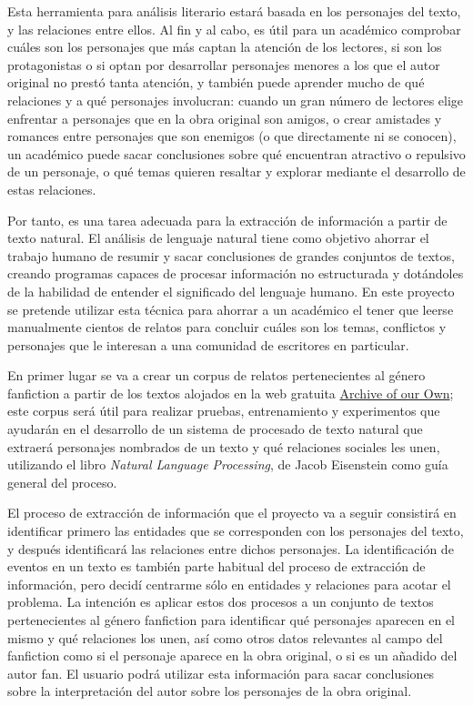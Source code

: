 \documentclass{pre-tfg}
\begin{document}
Esta herramienta para análisis literario estará basada en los personajes del texto, y las relaciones entre ellos. Al fin y al cabo, es útil para un académico comprobar cuáles son los personajes que más captan la atención de los lectores, si son los protagonistas o si optan por desarrollar personajes menores a los que el autor original no prestó tanta atención, y también puede aprender mucho de qué relaciones y a qué personajes involucran: cuando un gran número de lectores elige enfrentar a personajes que en la obra original son amigos, o crear amistades y romances entre personajes que son enemigos (o que directamente ni se conocen), un académico puede sacar conclusiones sobre qué encuentran atractivo o repulsivo de un personaje, o qué temas quieren resaltar y explorar mediante el desarrollo de estas relaciones.

Por tanto, es una tarea adecuada para la extracción de información a partir de texto natural. El análisis de lenguaje natural tiene como objetivo ahorrar el trabajo humano de resumir y sacar conclusiones de grandes conjuntos de textos, creando programas capaces de procesar información no estructurada y dotándoles de la habilidad de entender el significado del lenguaje humano. En este proyecto se pretende utilizar esta técnica para ahorrar a un académico el tener que leerse manualmente cientos de relatos para concluir cuáles son los temas, conflictos y personajes que le interesan a una comunidad de escritores en particular.

En primer lugar se va a crear un corpus de relatos pertenecientes al género fanfiction a partir de los textos alojados en la web gratuita \href{https://www.archiveofourown.org/}{Archive of our Own}; este corpus será útil para realizar pruebas, entrenamiento y experimentos que ayudarán en el desarrollo de un sistema de procesado de texto natural que extraerá personajes nombrados de un texto y qué relaciones sociales les unen, utilizando el libro \textit{Natural Language Processing}, de Jacob Eisenstein \cite{jacob} como guía general del proceso.

El proceso de extracción de información que el proyecto va a seguir consistirá en identificar primero las entidades que se corresponden con los personajes del texto, y después identificará las relaciones entre dichos personajes. La identificación de eventos en un texto es también parte habitual del proceso de extracción de información, pero decidí centrarme sólo en entidades y relaciones para acotar el problema. La intención es aplicar estos dos procesos a un conjunto de textos pertenecientes al género fanfiction para identificar qué personajes aparecen en el mismo y qué relaciones los unen, así como otros datos relevantes al campo del fanfiction como si el personaje aparece en la obra original, o si es un añadido del autor fan. El usuario podrá utilizar esta información para sacar conclusiones sobre la interpretación del autor sobre los personajes de la obra original.
\end{document}

